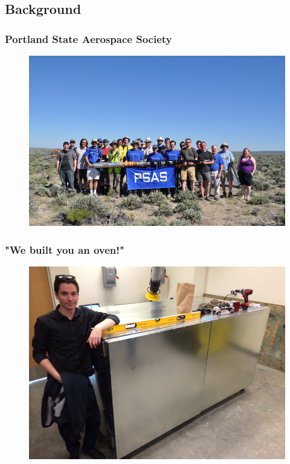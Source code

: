 \documentclass{beamer}
\begin{document}
\subsection{Background}
\begin{frame}
\frametitle{Portland State Aerospace Society}
\begin{figure}
\includegraphics[width=0.9\linewidth]{psas.jpg}
\end{figure}
\end{frame}
\begin{frame}
\frametitle{"We built you an oven!"}
\begin{figure}
\includegraphics[width=0.8\linewidth]{curing-oven.png}
\end{figure}
\end{frame}
\end{document}
